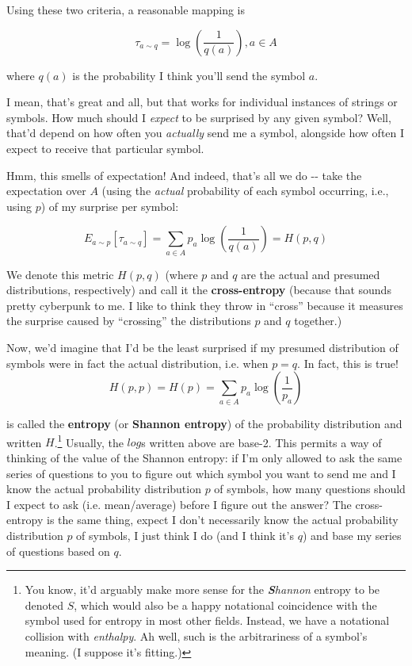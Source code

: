 \documentclass[letterpaper,12pt]{report}
\begin{document}
Using these two criteria, a reasonable mapping is

\[\tau_{a \sim q} = \log\left(\frac{1}{q(a)}\right), a \in A\]

where \(q(a)\) is the probability I think you'll send the symbol \(a\).

I mean, that's great and all, but that works for individual instances of
strings or symbols. How much should I \emph{expect} to be surprised by
any given symbol? Well, that'd depend on how often you \emph{actually}
send me a symbol, alongside how often I expect to receive that
particular symbol.

Hmm, this smells of expectation! And indeed, that's all we do -\/- take
the expectation over \(A\) (using the \emph{actual} probability of each
symbol occurring, i.e., using \(p\)) of my surprise per symbol:

\[E_{a \sim p}[\tau_{a \sim q}] = \sum_{a \in A} p_a \log\left(\frac{1}{q(a)}\right) = H(p,q)\]

We denote this metric \(H(p,q)\) (where \(p\) and \(q\) are the actual
and presumed distributions, respectively) and call it the
\textbf{cross-entropy} 
(because that sounds pretty cyberpunk to me. I
like to think they throw in ``cross'' because it measures the surprise
caused by ``crossing'' the distributions \(p\) and \(q\) together.)

Now, we'd imagine that I'd be the least surprised if my presumed
distribution of symbols were in fact the actual distribution, i.e. when
\(p = q\). In fact, this is true!
\[H(p,p) = H(p) = \sum_{a \in A} p_a \log\left(\frac{1}{p_a}\right)\]

is called the \textbf{entropy} (or \textbf{Shannon entropy})
of the
probability distribution and written \(H\).\footnote
{
  You know, it'd arguably make more sense for the 
  \emph{\textbf{S}hannon} entropy to be denoted \(S\),
  which would also be a happy notational coincidence 
  with the symbol used for entropy in most other fields. 
  Instead, we have a notational collision with \emph{enthalpy}.
  Ah well, such is the arbitrariness of a symbol's meaning. 
  (I suppose it's fitting.)
}
Usually, the \(log\)s written above are base-2. This permits a way of
thinking of the value of the Shannon entropy: if I'm only allowed to ask
the same series of questions to you to figure out which symbol you want
to send me and I know the actual probability distribution \(p\) of
symbols, how many questions should I expect to ask (i.e. mean/average)
before I figure out the answer? The cross-entropy is the same thing,
expect I don't necessarily know the actual probability distribution
\(p\) of symbols, I just think I do (and I think it's \(q\)) and base my
series of questions based on \(q\).
\end{document}
